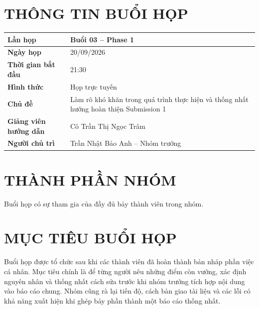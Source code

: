 \documentclass[10pt,a4paper]{article}
\begin{document}
\MakeHCMUTCover

\section{THÔNG TIN BUỔI HỌP}

\begin{table}[htbp]
  \centering
  \begin{tabularx}{\textwidth}{|>{\bfseries}L{45mm}|Y|}
    \hline
    Lần họp & Buổi 03 -- Phase 1\\
    \hline
    Ngày họp & 20/09/2026\\
    \hline
    Thời gian bắt đầu & 21:30\\
    \hline
    Hình thức & Họp trực tuyến\\
    \hline
    Chủ đề & Làm rõ khó khăn trong quá trình thực hiện và thống nhất hướng hoàn thiện Submission 1\\
    \hline
    Giảng viên hướng dẫn & Cô Trần Thị Ngọc Trâm\\
    \hline
    Người chủ trì & Trần Nhật Bảo Anh -- Nhóm trưởng\\
    \hline
  \end{tabularx}
\end{table}

\section{THÀNH PHẦN NHÓM}

\begin{HCMUTMemberTable}
\end{HCMUTMemberTable}

\noindent Buổi họp có sự tham gia của đầy đủ bảy thành viên trong nhóm.

\section{MỤC TIÊU BUỔI HỌP}

Buổi họp được tổ chức sau khi các thành viên đã hoàn thành bản nháp phần việc cá nhân. Mục tiêu chính là để từng người nêu những điểm còn vướng, xác định nguyên nhân và thống nhất cách sửa trước khi nhóm trưởng tích hợp nội dung vào báo cáo chung. Nhóm cũng rà lại tiến độ, cách bàn giao tài liệu và các lỗi có khả năng xuất hiện khi ghép bảy phần thành một báo cáo thống nhất.
\end{document}
